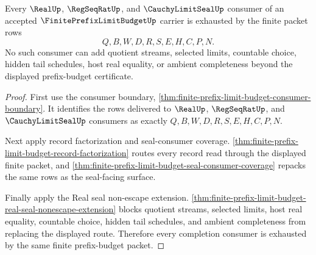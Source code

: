 \begin{theorem}
\label{thm:finite-prefix-limit-budget-completion-consumer-exhaustion}
Every $\RealUp$, $\RegSeqRatUp$, and $\CauchyLimitSealUp$ consumer of an accepted $\FinitePrefixLimitBudgetUp$ carrier is exhausted by the finite packet rows
$$
Q,B,W,D,R,S,E,H,C,P,N.
$$
No such consumer can add quotient streams, selected limits, countable choice, hidden tail schedules, host real equality, or ambient completeness beyond the displayed prefix-budget certificate.
\end{theorem}
\begin{proof}
First use the consumer boundary, \autoref{thm:finite-prefix-limit-budget-consumer-boundary}. It identifies the rows delivered to $\RealUp$, $\RegSeqRatUp$, and $\CauchyLimitSealUp$ consumers as exactly $Q,B,W,D,R,S,E,H,C,P,N$.

Next apply record factorization and seal-consumer coverage. \autoref{thm:finite-prefix-limit-budget-record-factorization} routes every record read through the displayed finite packet, and \autoref{thm:finite-prefix-limit-budget-seal-consumer-coverage} repacks the same rows as the seal-facing surface.

Finally apply the Real seal non-escape extension. \autoref{thm:finite-prefix-limit-budget-real-seal-nonescape-extension} blocks quotient streams, selected limits, host real equality, countable choice, hidden tail schedules, and ambient completeness from replacing the displayed route. Therefore every completion consumer is exhausted by the same finite prefix-budget packet.
\end{proof}

